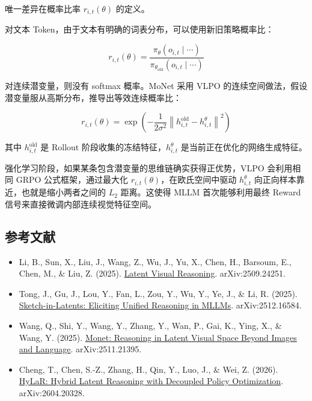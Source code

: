 唯一差异在概率比率 \(r_{i,t}(\theta)\) 的定义。

对文本 Token，由于文本有明确的词表分布，可以使用新旧策略概率比：

\[
r_{i,t}(\theta) =
\frac{\pi_{\theta}(o_{i,t}\mid\cdots)}
{\pi_{\theta_{\text{old}}}(o_{i,t}\mid\cdots)}
\]

对连续潜变量，则没有 softmax 概率。MoNet 采用 VLPO 的连续空间做法，假设潜变量服从高斯分布，推导出等效连续概率比：

\[
r_{i,t}(\theta) =
\exp\left(
-\frac{1}{2\sigma^2}
\left\lVert h_{i,t}^{\text{old}}-h_{i,t}^{\theta}\right\rVert^2
\right)
\]

其中 \(h_{i,t}^{\text{old}}\) 是 Rollout 阶段收集的冻结特征，\(h_{i,t}^{\theta}\) 是当前正在优化的网络生成特征。

强化学习阶段，如果某条包含潜变量的思维链确实获得正优势，VLPO 会利用相同 GRPO 公式框架，通过最大化 \(r_{i,t}(\theta)\)，在欧氏空间中驱动 \(h_{i,t}^{\theta}\) 向正向样本靠近，也就是缩小两者之间的 \(L_2\) 距离。这使得 MLLM 首次能够利用最终 Reward 信号来直接微调内部连续视觉特征空间。

\hypertarget{ux53c2ux8003ux6587ux732e-148}{%
\subsection{参考文献}\label{ux53c2ux8003ux6587ux732e-148}}

\vspace{0.25em}
\begin{itemize}
\tightlist
\item
  Li, B., Sun, X., Liu, J., Wang, Z., Wu, J., Yu, X., Chen, H., Barsoum, E., Chen, M., \& Liu, Z. (2025). \href{https://arxiv.org/abs/2509.24251}{Latent Visual Reasoning}. arXiv:2509.24251.
\item
  Tong, J., Gu, J., Lou, Y., Fan, L., Zou, Y., Wu, Y., Ye, J., \& Li, R. (2025). \href{https://arxiv.org/abs/2512.16584}{Sketch-in-Latents: Eliciting Unified Reasoning in MLLMs}. arXiv:2512.16584.
\item
  Wang, Q., Shi, Y., Wang, Y., Zhang, Y., Wan, P., Gai, K., Ying, X., \& Wang, Y. (2025). \href{https://arxiv.org/abs/2511.21395}{Monet: Reasoning in Latent Visual Space Beyond Images and Language}. arXiv:2511.21395.
\item
  Cheng, T., Chen, S.-Z., Zhang, H., Qin, Y., Luo, J., \& Wei, Z. (2026). \href{https://arxiv.org/abs/2604.20328}{HyLaR: Hybrid Latent Reasoning with Decoupled Policy Optimization}. arXiv:2604.20328.
\end{itemize}

